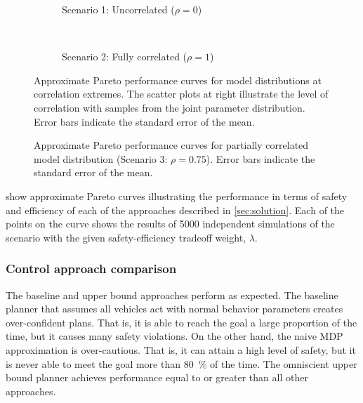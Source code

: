 \begin{figure}[p]
    \centering
    \begin{subfigure}{\textwidth}
        \centering
        
        \vspace{-1em}
        \caption{Scenario 1: Uncorrelated ($\rho=0$)} \label{fig:000}
    \end{subfigure}\\
    \begin{subfigure}{\textwidth}
        \centering
        \vspace{1cm}
        
        \vspace{-1em}
        \caption{Scenario 2: Fully correlated ($\rho=1$)} \label{fig:100}
        \vspace{1em}
    \end{subfigure}
    \caption[Performance curves at correlation extremes]{Approximate Pareto performance curves for model distributions at correlation extremes. The scatter plots at right illustrate the level of correlation with samples from the joint parameter distribution. Error bars indicate the standard error of the mean.}
    \label{fig:gaps}
\end{figure}

\begin{figure}[htbp]
    \centering
    
    \caption[Performance curves at correlation \num{0.75}]{Approximate Pareto performance curves for partially correlated model distribution (Scenario 3: $\rho=0.75$). Error bars indicate the standard error of the mean.}
    \label{fig:075}
\end{figure}


 show approximate Pareto curves illustrating the performance in terms of safety and efficiency of each of the approaches described in \cref{sec:solution}.
Each of the points on the curve shows the results of \num{5000} independent simulations of the scenario with the given safety-efficiency tradeoff weight, $\lambda$.

\subsubsection{Control approach comparison}

The baseline and upper bound approaches perform as expected.
The baseline planner that assumes all vehicles act with normal behavior parameters creates over-confident plans.
That is, it is able to reach the goal a large proportion of the time, but it causes many safety violations.
On the other hand, the naive MDP approximation is over-cautious. 
That is, it can attain a high level of safety, but it is never able to meet the goal more than \SI{80}{\percent} of the time.
The omniscient upper bound planner achieves performance equal to or greater than all other approaches.

